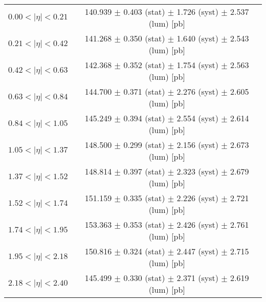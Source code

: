 \begin{tabular}{lc}
\hline
$0.00 < |\eta| <0.21$          & 140.939 $\pm$ 0.403 (stat) $\pm$ 1.726 (syst) $\pm$ 2.537 (lum) [pb]  \\
$0.21 < |\eta| <0.42$          & 141.268 $\pm$ 0.350 (stat) $\pm$ 1.640 (syst) $\pm$ 2.543 (lum) [pb]  \\
$0.42 < |\eta| <0.63$          & 142.368 $\pm$ 0.352 (stat) $\pm$ 1.754 (syst) $\pm$ 2.563 (lum) [pb]  \\
$0.63 < |\eta| <0.84$          & 144.700 $\pm$ 0.371 (stat) $\pm$ 2.276 (syst) $\pm$ 2.605 (lum) [pb]  \\
$0.84 < |\eta| <1.05$          & 145.249 $\pm$ 0.394 (stat) $\pm$ 2.554 (syst) $\pm$ 2.614 (lum) [pb]  \\
$1.05 < |\eta| <1.37$          & 148.500 $\pm$ 0.299 (stat) $\pm$ 2.156 (syst) $\pm$ 2.673 (lum) [pb]  \\
$1.37 < |\eta| <1.52$          & 148.814 $\pm$ 0.397 (stat) $\pm$ 2.323 (syst) $\pm$ 2.679 (lum) [pb]  \\
$1.52 < |\eta| <1.74$          & 151.159 $\pm$ 0.335 (stat) $\pm$ 2.226 (syst) $\pm$ 2.721 (lum) [pb]  \\
$1.74 < |\eta| <1.95$          & 153.363 $\pm$ 0.353 (stat) $\pm$ 2.426 (syst) $\pm$ 2.761 (lum) [pb]  \\
$1.95 < |\eta| <2.18$          & 150.816 $\pm$ 0.324 (stat) $\pm$ 2.447 (syst) $\pm$ 2.715 (lum) [pb]  \\
$2.18 < |\eta| <2.40$          & 145.499 $\pm$ 0.330 (stat) $\pm$ 2.371 (syst) $\pm$ 2.619 (lum) [pb]  \\
\hline
\end{tabular}
